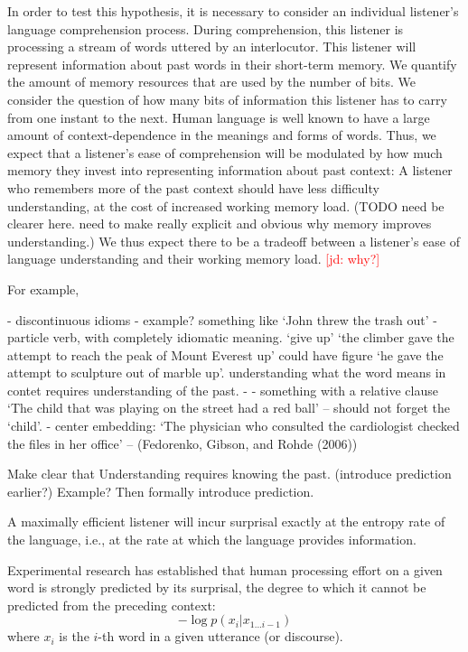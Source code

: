 \documentclass[11pt,letterpaper]{article}
\newcommand{\jd}[1]{\textcolor{Red}{[jd: #1]}}
\begin{document}
In order to test this hypothesis, it is necessary to consider an individual listener's language comprehension process.
During comprehension, this listener is processing a stream of words uttered by an interlocutor.
This listener will represent information about past words in their short-term memory.
We quantify the amount of memory resources that are used by the number of bits.
We consider the question of how many bits of information this listener has to carry from one instant to the next.  %
Human language is well known to have a large amount of context-dependence in the meanings and forms of words.
Thus, we expect that a listener's ease of comprehension will be modulated by how much memory they invest into representing information about past context:
A listener who remembers more of the past context should have less difficulty understanding, at the cost of increased working memory load. (TODO need be clearer here. need to make really explicit and obvious why memory improves understanding.)
We thus expect there to be a tradeoff between a listener's ease of language understanding and their working memory load. \jd{why?}


For example, 

- discontinuous idioms
- example? something like `John threw the trash out'
- particle verb, with completely idiomatic meaning. `give up' `the climber gave the attempt to reach the peak of Mount Everest up' could have figure `he gave the attempt to sculpture out of marble up'. understanding what the word means in contet requires understanding of the past.
- 
- something with a relative clause `The child that was playing on the street had a red ball' -- should not forget the `child'.
- center embedding: `The physician who consulted the cardiologist checked the files in her office' -- (Fedorenko, Gibson, and Rohde (2006))

Make clear that Understanding requires knowing the past. (introduce prediction earlier?) Example? Then formally introduce prediction.


A maximally efficient listener will incur surprisal exactly at the entropy rate of the language, i.e., at the rate at which the language provides information.


Experimental research has established that human processing effort on a given word is strongly predicted by its surprisal, the degree to which it cannot be predicted from the preceding context:
\begin{equation}\label{eq:surp}
	-\log p(x_i|x_{1...i-1})
\end{equation}
where $x_i$ is the $i$-th word in a given utterance (or discourse).
\end{document}
